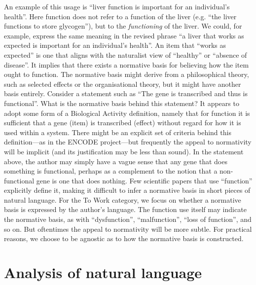 \documentclass{article}
\begin{document}
An example of this usage is ``liver function is important for an individual's health''.
Here function does not refer to a function of the liver (e.g. ``the liver functions to store glycogen''), but to the \emph{functioning} of the liver.
We could, for example, express the same meaning in the revised phrase ``a liver that works as expected is important for an individual's health''.
An item that ``works as expected'' is one that aligns with the naturalist view of ``healthy'' or ``absence of disease''.
It implies that there exists a normative basis for believing how the item ought to function.
The normative basis might derive from a philosophical theory, such as selected effects or the organisational theory, but it might have another basis entirely.
Consider a statement such as ``The gene is transcribed and thus is functional''.
What is the normative basis behind this statement?
It appears to adopt some form of a Biological Activity definition, namely that for function it is sufficient that a gene (item) is transcribed (effect) without regard for how it is used within a system.
There might be an explicit set of criteria behind this definition---as in the ENCODE project---but frequently the appeal to normativity will be implicit (and its justification may be less than sound).
In the statement above, the author may simply have a vague sense that any gene that does something is functional, perhaps as a complement to the notion that a non-functional gene is one that does nothing.
Few scientific papers that use ``function'' explicitly define it, making it difficult to infer a normative basis in short pieces of natural language.
For the To Work category, we focus on whether a normative basis is expressed by the author's language.
The function use itself may indicate the normative basis, as with ``dysfunction'', ``malfunction'', ``loss of function'', and so on.
But oftentimes the appeal to normativity will be more subtle.
For practical reasons, we choose to be agnostic as to how the normative basis is constructed.

\section{Analysis of natural language}
\label{sec:analys-natur-lang}
\end{document}
